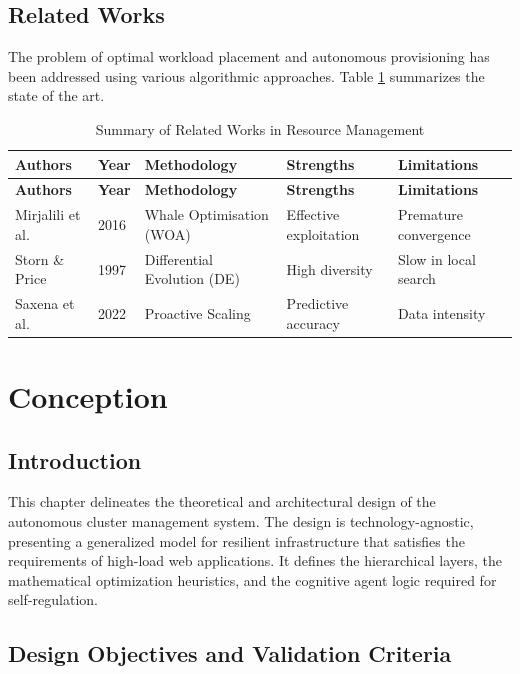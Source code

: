 \documentclass[12pt,a4paper]{report}
\begin{document}
\section{Related Works}

The problem of optimal workload placement and autonomous provisioning has been addressed using various algorithmic approaches. Table \ref{tab:related_works} summarizes the state of the art.

\begin{longtable}{@{}p{3cm}p{1cm}p{3cm}p{3cm}p{3cm}@{}}
\caption{Summary of Related Works in Resource Management} \label{tab:related_works} \\
\toprule
\textbf{Authors} & \textbf{Year} & \textbf{Methodology} & \textbf{Strengths} & \textbf{Limitations} \\ \midrule
\endfirsthead
\toprule
\textbf{Authors} & \textbf{Year} & \textbf{Methodology} & \textbf{Strengths} & \textbf{Limitations} \\ \midrule
\endhead
\bottomrule
\endfoot
Mirjalili et al. & 2016 & Whale Optimisation (WOA) & Effective exploitation & Premature convergence \\ \midrule
Storn \& Price & 1997 & Differential Evolution (DE) & High diversity & Slow in local search \\ \midrule
Saxena et al. & 2022 & Proactive Scaling & Predictive accuracy & Data intensity \\ \bottomrule
\end{longtable}

\chapter{Conception}

\section{Introduction}

This chapter delineates the theoretical and architectural design of the autonomous cluster management system. The design is technology-agnostic, presenting a generalized model for resilient infrastructure that satisfies the requirements of high-load web applications. It defines the hierarchical layers, the mathematical optimization heuristics, and the cognitive agent logic required for self-regulation.

\section{Design Objectives and Validation Criteria}
\end{document}
